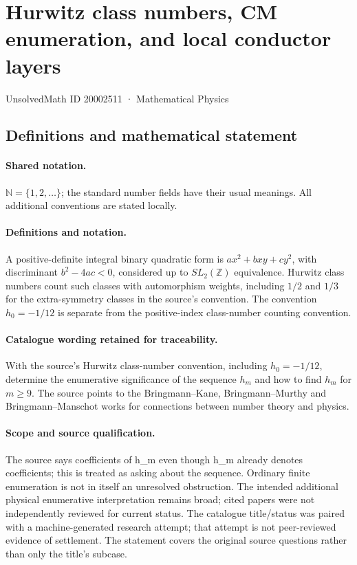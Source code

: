 \documentclass[11pt]{article}
\begin{document}
\setcounter{section}{20002510}
\section{Hurwitz class numbers, CM enumeration, and local conductor layers}\label{20002511}
{\small UnsolvedMath ID 20002511 · Mathematical Physics}
\subsection{Definitions and mathematical statement}

\paragraph{Shared notation.}$\mathbb N=\{1,2,\ldots\}$; the standard number fields have their usual meanings. All additional conventions are stated locally.


\paragraph{Definitions and notation.}A positive-definite integral binary quadratic form is $ax^2+bxy+cy^2$, with discriminant $b^2-4ac<0$, considered up to $SL_2(\mathbb Z)$ equivalence. Hurwitz class numbers count such classes with automorphism weights, including $1/2$ and $1/3$ for the extra-symmetry classes in the source’s convention. The convention $h_0=-1/12$ is separate from the positive-index class-number counting convention.

\paragraph{Catalogue wording retained for traceability.}
With the source’s Hurwitz class-number convention, including $h_0=-1/12$, determine the enumerative significance of the sequence $h_m$ and how to find $h_m$ for $m\ge9$. The source points to the Bringmann--Kane, Bringmann--Murthy and Bringmann--Manschot works for connections between number theory and physics.
\paragraph{Scope and source qualification.}The source says coefficients of h_m even though h_m already denotes coefficients; this is treated as asking about the sequence. Ordinary finite enumeration is not in itself an unresolved obstruction. The intended additional physical enumerative interpretation remains broad; cited papers were not independently reviewed for current status. The catalogue title/status was paired with a machine-generated research attempt; that attempt is not peer-reviewed evidence of settlement. The statement covers the original source questions rather than only the title’s subcase.
\end{document}

